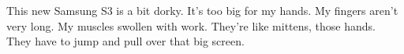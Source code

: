 

This new Samsung S3 is a bit dorky.  It's too big for my hands.  My
fingers aren't very long.  My muscles swollen with work.  They're like
mittens, those hands.  They have to jump and pull over that big screen.

\bye
